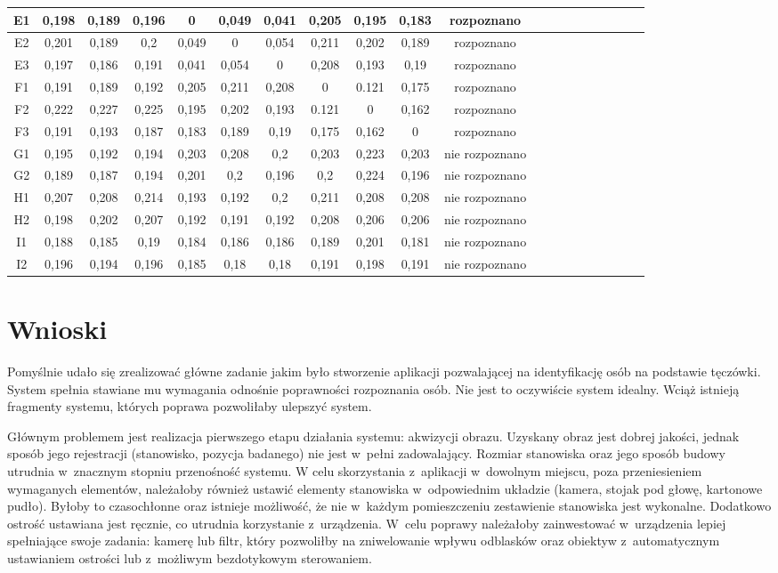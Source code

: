 \begin{table}
\begin{center}
\begin{tabular}{|c|c|c|c|c|c|c|c|c|c|c|c|c|c|c|c|c|c|c|l|}
E1 & 0,198&0,189&0,196&0&0,049&0,041&0,205&0,195&0,183 & rozpoznano\\ \hline
E2 & 0,201&0,189&0,2&0,049&0&0,054&0,211&0,202&0,189 & rozpoznano\\ \hline
E3 & 0,197&0,186&0,191&0,041&0,054&0&0,208&0,193&0,19 & rozpoznano\\ \hline
F1 & 0,191&0,189&0,192&0,205&0,211&0,208&0&0.121&0,175 & rozpoznano\\ \hline
F2 & 0,222&0,227&0,225&0,195&0,202&0,193&0.121&0&0,162 & rozpoznano\\ \hline
F3 & 0,191&0,193&0,187&0,183&0,189&0,19&0,175&0,162&0 & rozpoznano\\ \hline
G1 & 0,195&0,192&0,194&0,203&0,208&0,2&0,203&0,223&0,203 & nie rozpoznano\\ \hline
G2 & 0,189&0,187&0,194&0,201&0,2&0,196&0,2&0,224&0,196 & nie rozpoznano\\ \hline
H1 & 0,207&0,208&0,214&0,193&0,192&0,2&0,211&0,208&0,208 & nie rozpoznano\\ \hline
H2 & 0,198&0,202&0,207&0,192&0,191&0,192&0,208&0,206&0,206 & nie rozpoznano\\ \hline
I1 & 0,188&0,185&0,19&0,184&0,186&0,186&0,189&0,201&0,181 & nie rozpoznano\\ \hline
I2 & 0,196&0,194&0,196&0,185&0,18&0,18&0,191&0,198&0,191 & nie rozpoznano\\ \hline
\end{tabular}
\end{center}
\end{table}

\section{Wnioski}
\label{sec:wnioski}

Pomyślnie udało się zrealizować główne zadanie jakim było stworzenie aplikacji pozwalającej na identyfikację osób na podstawie tęczówki. System spełnia stawiane mu wymagania odnośnie poprawności rozpoznania osób. Nie jest to oczywiście system idealny. Wciąż istnieją fragmenty systemu, których poprawa pozwoliłaby ulepszyć system.

Głównym problemem jest realizacja pierwszego etapu działania systemu: akwizycji obrazu. Uzyskany obraz jest dobrej jakości, jednak sposób jego  rejestracji (stanowisko, pozycja badanego) nie jest w~pełni zadowalający. Rozmiar stanowiska oraz jego sposób budowy utrudnia w~znacznym stopniu przenośność systemu. W celu skorzystania z~aplikacji w~dowolnym miejscu, poza przeniesieniem wymaganych elementów, należałoby również ustawić elementy stanowiska w~odpowiednim układzie (kamera, stojak pod głowę, kartonowe pudło). Byłoby to czasochłonne oraz istnieje możliwość, że nie w~każdym pomieszczeniu zestawienie stanowiska jest wykonalne. Dodatkowo ostrość ustawiana jest ręcznie, co utrudnia korzystanie z~urządzenia. W~celu poprawy należałoby zainwestować w~urządzenia lepiej spełniające swoje zadania: kamerę lub filtr, który pozwoliłby na zniwelowanie wpływu odblasków oraz obiektyw z~automatycznym ustawianiem ostrości lub z~możliwym bezdotykowym sterowaniem.

